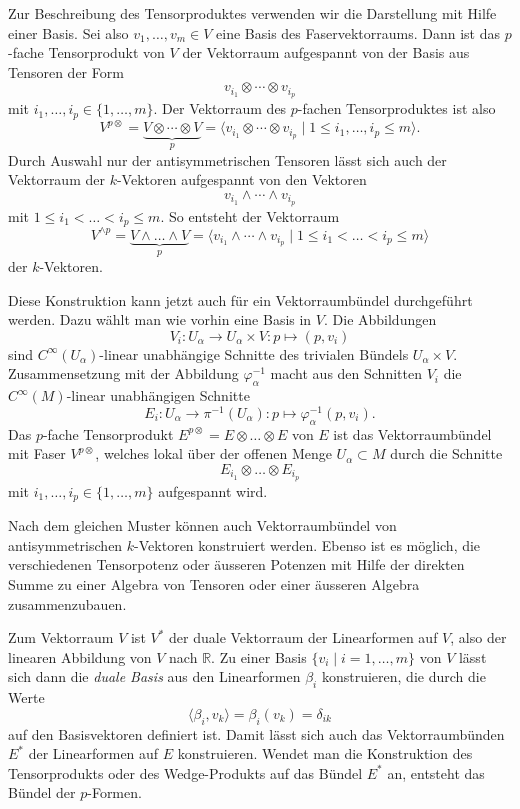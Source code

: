 Zur Beschreibung des Tensorproduktes verwenden wir die Darstellung
mit Hilfe einer Basis.
Sei also $v_1,\dots,v_m\in V$ eine Basis des Faservektorraums.
Dann ist das $p$-fache Tensorprodukt von $V$ der Vektorraum aufgespannt
von der Basis aus Tensoren der Form
\[
v_{i_1}\otimes \cdots\otimes v_{i_p}
\]
mit $i_1,\dots,i_p\in \{1,\dots,m\}$.
Der Vektorraum des $p$-fachen Tensorproduktes ist also
\[
V^{p\otimes}
=
\underbrace{ V\otimes\cdots\otimes V }_{\displaystyle p}
=
\langle
v_{i_1}\otimes\cdots\otimes v_{i_p}
\mid
1\le
i_1,\dots,i_p 
\le m
\rangle.
\]
Durch Auswahl nur der antisymmetrischen Tensoren lässt sich auch
der Vektorraum der $k$-Vektoren aufgespannt von den Vektoren
\[
v_{i_1}\wedge\cdots\wedge v_{i_p}
\]
mit $1\le i_1 < \dots < i_p\le m$.
So entsteht der Vektorraum 
\[
V^{\wedge p}
=
\underbrace{V\wedge\dots\wedge V}_{\displaystyle p}
=
\langle
v_{i_1}\wedge\cdots\wedge v_{i_p}
\mid
1\le i_1 < \dots < i_p\le m
\rangle
\]
der $k$-Vektoren.

Diese Konstruktion kann jetzt auch für ein Vektorraumbündel
durchgeführt werden.
Dazu wählt man wie vorhin eine Basis in $V$. 
Die Abbildungen
\[
V_i
\colon
U_\alpha \to U_\alpha\times V
:
p\mapsto (p,v_i)
\]
sind $C^\infty(U_\alpha)$-linear unabhängige Schnitte des trivialen
Bündels $U_\alpha\times V$.
Zusammensetzung mit der Abbildung $\varphi_\alpha^{-1}$ macht aus den
Schnitten $V_i$ die $C^\infty(M)$-linear unabhängigen Schnitte
\[
E_i
\colon
U_\alpha \to \pi^{-1}(U_\alpha)
:
p \mapsto \varphi_\alpha^{-1}(p,v_i).
\]
Das $p$-fache Tensorprodukt $E^{p\otimes}=E\otimes\dots\otimes E$ von $E$ 
ist das Vektorraumbündel mit Faser $V^{p\otimes}$, welches lokal über der
offenen Menge $U_\alpha\subset M$ durch die Schnitte 
\[
E_{i_1}\otimes \dots \otimes E_{i_p}
\]
mit
$i_1,\dots,i_p\in\{1,\dots,m\}$
aufgespannt wird.

Nach dem gleichen Muster können auch Vektorraumbündel von
antisymmetrischen $k$-Vektoren konstruiert werden.
Ebenso ist es möglich, die verschiedenen Tensorpotenz oder
äusseren Potenzen mit Hilfe der direkten Summe zu einer Algebra
von Tensoren oder einer äusseren Algebra zusammenzubauen.

Zum Vektorraum $V$ ist $V^*$ der duale Vektorraum der Linearformen
auf $V$, also der linearen Abbildung von $V$ nach $\mathbb{R}$.
Zu einer Basis $\{v_i\mid i=1,\dots,m\}$ von $V$ lässt sich dann
die {\em duale Basis} aus den Linearformen $\beta_i$ konstruieren, die
%
durch die Werte
\[
\langle \beta_i,v_k\rangle
=
\beta_i (v_k)
=
\delta_{ik}
\]
auf den Basisvektoren definiert ist.
Damit lässt sich auch das Vektorraumbünden $E^*$ der Linearformen
auf $E$ konstruieren.
Wendet man die Konstruktion des Tensorprodukts oder des Wedge-Produkts
auf das Bündel $E^*$ an, entsteht das Bündel der 
$p$-Formen.

